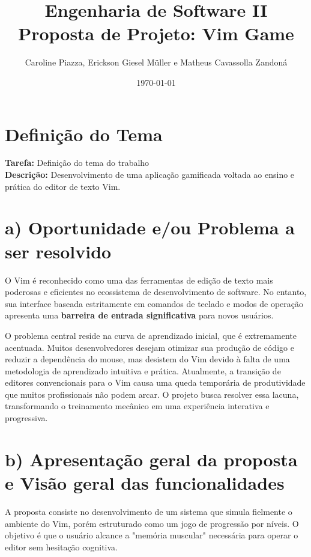 \documentclass[12pt,a4paper]{article}
\title{Engenharia de Software II \\ \textbf{Proposta de Projeto: Vim Game}}
\author{Caroline Piazza, Erickson Giesel Müller e Matheus Cavassolla Zandoná}
\date{\today}
\begin{document}
\maketitle

\section*{Definição do Tema}
\textbf{Tarefa:} Definição do tema do trabalho \\

\textbf{Descrição:} Desenvolvimento de uma aplicação gamificada voltada ao ensino e prática do editor de texto Vim.

\section*{a) Oportunidade e/ou Problema a ser resolvido}

O Vim é reconhecido como uma das ferramentas de edição de texto mais poderosas e eficientes no ecossistema de desenvolvimento de software. No entanto, sua interface baseada estritamente em comandos de teclado e modos de operação apresenta uma \textbf{barreira de entrada significativa} para novos usuários.

O problema central reside na curva de aprendizado inicial, que é extremamente acentuada. Muitos desenvolvedores desejam otimizar sua produção de código e reduzir a dependência do mouse, mas desistem do Vim devido à falta de uma metodologia de aprendizado intuitiva e prática. Atualmente, a transição de editores convencionais para o Vim causa uma queda temporária de produtividade que muitos profissionais não podem arcar. O projeto busca resolver essa lacuna, transformando o treinamento mecânico em uma experiência interativa e progressiva.

\section*{b) Apresentação geral da proposta e Visão geral das funcionalidades}

A proposta consiste no desenvolvimento de um sistema que simula fielmente o ambiente do Vim, porém estruturado como um jogo de progressão por níveis. O objetivo é que o usuário alcance a "memória muscular" necessária para operar o editor sem hesitação cognitiva.
\end{document}
